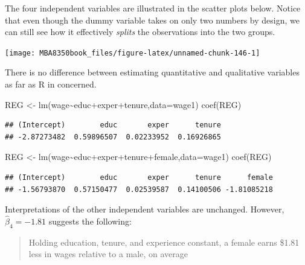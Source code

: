 \documentclass[
]{book}
\newenvironment{Shaded}{\begin{snugshade}}{\end{snugshade}}
\newcommand{\AttributeTok}[1]{\textcolor[rgb]{0.77,0.63,0.00}{#1}}
\newcommand{\FunctionTok}[1]{\textcolor[rgb]{0.00,0.00,0.00}{#1}}
\newcommand{\NormalTok}[1]{#1}
\newcommand{\OtherTok}[1]{\textcolor[rgb]{0.56,0.35,0.01}{#1}}
\newcommand{\SpecialCharTok}[1]{\textcolor[rgb]{0.00,0.00,0.00}{#1}}
\begin{document}
The four independent variables are illustrated in the scatter plots below. Notice that even though the dummy variable takes on only two numbers by design, we can still see how it effectively \emph{splits} the observations into the two groups.

\begin{center}\texttt{[image: MBA8350book\_files/figure-latex/unnamed-chunk-146-1]} \end{center}

There is no difference between estimating quantitative and qualitative variables as far as R in concerned.

\begin{Shaded}
\begin{Highlighting}[]
\NormalTok{REG }\OtherTok{\textless{}{-}} \FunctionTok{lm}\NormalTok{(wage}\SpecialCharTok{\textasciitilde{}}\NormalTok{educ}\SpecialCharTok{+}\NormalTok{exper}\SpecialCharTok{+}\NormalTok{tenure,}\AttributeTok{data=}\NormalTok{wage1)}
\FunctionTok{coef}\NormalTok{(REG)}
\end{Highlighting}
\end{Shaded}

\begin{verbatim}
## (Intercept)        educ       exper      tenure 
## -2.87273482  0.59896507  0.02233952  0.16926865
\end{verbatim}

\begin{Shaded}
\begin{Highlighting}[]
\NormalTok{REG }\OtherTok{\textless{}{-}} \FunctionTok{lm}\NormalTok{(wage}\SpecialCharTok{\textasciitilde{}}\NormalTok{educ}\SpecialCharTok{+}\NormalTok{exper}\SpecialCharTok{+}\NormalTok{tenure}\SpecialCharTok{+}\NormalTok{female,}\AttributeTok{data=}\NormalTok{wage1)}
\FunctionTok{coef}\NormalTok{(REG)}
\end{Highlighting}
\end{Shaded}

\begin{verbatim}
## (Intercept)        educ       exper      tenure      female 
## -1.56793870  0.57150477  0.02539587  0.14100506 -1.81085218
\end{verbatim}

Interpretations of the other independent variables are unchanged. However, \(\hat{\beta}_4 = -1.81\) suggests the following:

\begin{quote}
Holding education, tenure, and experience constant, a female earns \$1.81 less in wages relative to a male, on average
\end{quote}
\end{document}
